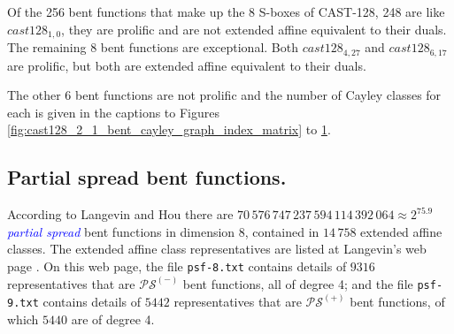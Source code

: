 \documentclass[12pt,a4paper]{article}
\newcommand{\Emph}[1]{\emph{\textcolor{blue}{#1}}}
\begin{document}
\begin{figure}[!ht]
\begin{minipage}{.48\textwidth}
  \label{fig:cast128_7_21_bent_cayley_graph_index_matrix}
\end{minipage}%
\end{figure}

Of the 256 bent functions that make up the 8 S-boxes of CAST-128, 248 are like $cast128_{1,0}$,
they are prolific and are not extended affine equivalent to their duals.
The remaining 8 bent functions are exceptional.
Both $cast128_{4,27}$ and $cast128_{6,17}$ are prolific, but both are extended affine equivalent to their duals.

The other 6 bent functions are not prolific and the number of Cayley classes for each is given in the captions to
Figures \ref{fig:cast128_2_1_bent_cayley_graph_index_matrix} to \ref{fig:cast128_7_21_bent_cayley_graph_index_matrix}.
\newpage
\subsection{Partial spread bent functions.}

According to Langevin and Hou \cite{LanH11counting}
there are $70\,576\,747\,237\,594\,114\,392\,064 \approx 2^{75.9}$ \Emph{partial spread} bent functions in
dimension 8,
contained in $14\,758$ extended affine classes.
The extended affine class representatives are listed at Langevin's web page \cite{Lan10psf}.
On this web page,
the file \texttt{psf-8.txt} contains details of $9316$ representatives that are
$\mathcal{PS}^{(-)}$ bent functions, all of degree 4; and
the file \texttt{psf-9.txt} contains details of $5442$ representatives that are
$\mathcal{PS}^{(+)}$ bent functions, of which $5440$ are of degree 4.
\end{document}
